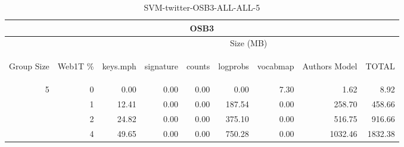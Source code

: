 \begin{center}
\begin{table}[htbp] 
 \begin{center}
\begin{tabular}{ | r | r | r | r | r | r | r | r | r |}
\hline
\multicolumn{9}{|c|}{OSB3}\\
\hline
 & & \multicolumn{7}{|c|}{Size (MB)}\\ \cline{3-9}
\begin{sideways}Group Size\end{sideways} & \begin{sideways}Web1T \% \end{sideways} & \begin{sideways}keys.mph\end{sideways} & \begin{sideways}signature\end{sideways} & \begin{sideways}counts\end{sideways} & \begin{sideways}logprobs\end{sideways} & \begin{sideways}vocabmap\end{sideways} & \begin{sideways}Authors Model \end{sideways} & \begin{sideways}TOTAL\end{sideways}\\
\hline
\multirow{3}{*}{5}
 & 0 & 0.00 & 0.00 & 0.00 & 0.00 & 7.30 & 1.62 & 8.92\\ \cline{2-9}
 & 1 & 12.41 & 0.00 & 0.00 & 187.54 & 0.00 & 258.70 & 458.66\\ \cline{2-9}
 & 2 & 24.82 & 0.00 & 0.00 & 375.10 & 0.00 & 516.75 & 916.66\\ \cline{2-9}
 & 4 & 49.65 & 0.00 & 0.00 & 750.28 & 0.00 & 1032.46 & 1832.38\\ \cline{2-9}
\hline
\end{tabular}
\caption{SVM-twitter-OSB3-ALL-ALL-5}
\label{table:SVM-twitter-OSB3-ALL-ALL-5}
\end{center}
 \end{table}
\end{center}

